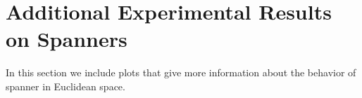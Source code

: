 \documentclass[]{ws-ijcga}
\newcommand{\ignore}[1]{}
\def \expDistDataPath {./}
\begin{document}


\appendix

\section{Additional Experimental Results on Spanners}
\label{sec:spanners_euclidean_addendum}
In this section we include plots that give more information
about the behavior of \bgrdy spanner in Euclidean space.

\ignore{
\begin{figure}[ht!]
    \begin{centering}
\begin{tikzpicture}
    \begin{axis}[xlabel=\# Points,ylabel=\# Edges,
        legend pos=outer north east]

    \addplot+ table [x=n_points, y=edges_blind_random, col sep=comma] {\expDistDataPath all_methods_dim_2_eps_0.1.txt};
    \addlegendentry{Blind random}

    \addplot+ table [x=n_points, y=edges_blind_random_connect_first, col sep=comma] {\expDistDataPath all_methods_dim_2_eps_0.1.txt};
    \addlegendentry{Blind random, connect first}


    \addplot+ table [x=n_points, y=edges_blind_random_lower_bound_first, col sep=comma] {\expDistDataPath all_methods_dim_2_eps_0.1.txt};
    \addlegendentry{Blind random, lower bound first}

    \addplot+ table [x=n_points, y=edges_blind_random_connect_first_lower_bound_first, col sep=comma] {\expDistDataPath all_methods_dim_2_eps_0.1.txt};
    \addlegendentry{Blind random, connect first, lower bound first}

\end{axis}
\end{tikzpicture}
\end{centering}
    \caption{Comparison of the four variants of \brndm algorithm.}
    \label{fig:blind_rbr_variants}
\end{figure}
}
\end{document}
